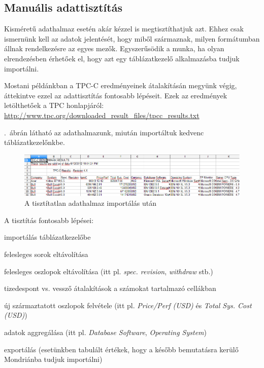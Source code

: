 \documentclass[a4paper,10pt,titlepage]{article}
\newenvironment{sajat_itemize}
{
	\begin{itemize}
	\setlength{\itemsep}{0pt}
}
{
	\end{itemize}
}
\begin{document}
\subsection{Manuális adattisztítás}

Kisméretű adathalmaz esetén akár kézzel is megtisztíthatjuk azt. Ehhez csak ismernünk kell az adatok jelentését, hogy miből származnak, milyen formátumban állnak rendelkezésre az egyes mezők. Egyszerűsödik a munka, ha olyan elrendezésben érhetőek el, hogy azt egy táblázatkezelő alkalmazásba tudjuk importálni. 

Mostani példánkban a TPC-C eredményeinek átalakításán megyünk végig, áttekintve ezzel az adattisztítás fontosabb lépéseit. Ezek az eredmények letölthetőek a TPC honlapjáról: \url{http://www.tpc.org/downloaded\_result\_files/tpcc\_results.txt}

.~ábrán látható az adathalmazunk, miután importáltuk kedvenc táblázatkezelőnkbe.

\begin{figure}[h!]
\centering
\includegraphics[width=1.00\textwidth]{figures/tpc_raw.png}
\caption{A tisztítatlan adathalmaz importálás után \label{fig:tpc_raw}}
\end{figure}

A tisztítás fontosabb lépései:

\begin{sajat_itemize}
\item importálás táblázatkezelőbe
\item felesleges sorok eltávolítása
\item felesleges oszlopok eltávolítása (itt pl. \emph{spec. revision}, \emph{withdraw} stb.)
\item tizedespont vs. vessző átalakítások a számokat tartalmazó cellákban
\item új származtatott oszlopok felvétele (itt pl. \emph{Price/Perf (USD)} és \emph{Total Sys. Cost (USD)})
\item adatok aggregálása (itt pl. \emph{Database Software}, \emph{Operating System})
\item exportálás (esetünkben tabulált értékek, hogy a később bemutatásra kerülő Mondriánba tudjuk importálni)
\end{sajat_itemize}
\end{document}
